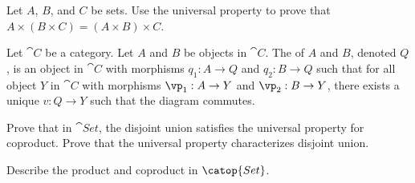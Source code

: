 \documentclass[10pt]{article}
\begin{document}
\begin{problem}
    Let $A$, $B$, and $C$ be sets. Use the universal property to prove that $A\times(B\times C)=(A\times B)\times C$.
\end{problem}
\begin{definition}
    Let $\cat{C}$ be a category. Let $A$ and $B$ be objects in $\cat{C}$. The  of $A$ and $B$, denoted $Q$, is an object in $\cat{C}$ with morphisms ${q}_{1}:A\to Q$ and ${q}_{2}:B\to Q$ such that for all object $Y$ in $\cat{C}$ with morphisms ${\vp}_{1}:A\to Y$ and ${\vp}_{2}:B\to Y$, there exists a unique $v:Q\to Y$ such that the diagram commutes.
\end{definition}
\begin{center}
\end{center}
\begin{problem}
    Prove that in $\cat{Set}$, the disjoint union satisfies the universal property for coproduct. Prove that the universal property characterizes disjoint union.
\end{problem}
\begin{problem}
    Describe the product and coproduct in $\catop{Set}$. 
\end{problem}
\end{document}

